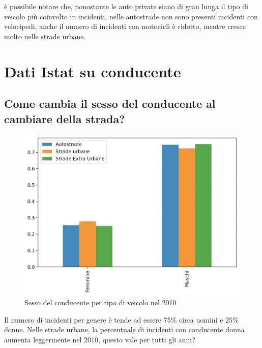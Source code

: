 \documentclass[a4paper]{report}
\begin{document}

è possibile notare che, nonostante le auto private siano di gran lunga il tipo di veicolo 
più coinvolto in incidenti, nelle autostrade non sono presenti incidenti con velocipedi, 
anche il numero di incidenti con motocicli è ridotto, mentre cresce molto nelle strade urbane.


\section{Dati Istat su conducente}

\subsection{Come cambia il sesso del conducente al cambiare della strada?}

\begin{figure}
    \includegraphics[width=\linewidth]{../src/incidenti/incidenti_senza_coords/tipo_veicoli/uomo-donna.png}
    \caption{Sesso del conducente per tipo di veicolo nel 2010}
    \label{fig:differenza_uomo_donna}
\end{figure}


Il numero di incidenti per genere è tende ad essere 75\% circa uomini e 25\% donne.
Nelle strade  urbane, la percentuale di incidenti con conducente donna aumenta leggermente nel 2010, 
questo vale per tutti gli anni?

\end{document}
